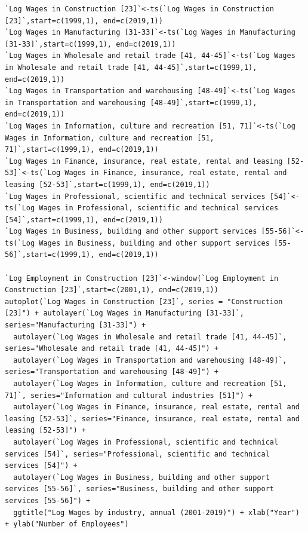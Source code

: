 \documentclass[12pt]{article}
\begin{document}
\begin{verbatim}
`Log Wages in Construction [23]`<-ts(`Log Wages in Construction [23]`,start=c(1999,1), end=c(2019,1))
`Log Wages in Manufacturing [31-33]`<-ts(`Log Wages in Manufacturing [31-33]`,start=c(1999,1), end=c(2019,1))
`Log Wages in Wholesale and retail trade [41, 44-45]`<-ts(`Log Wages in Wholesale and retail trade [41, 44-45]`,start=c(1999,1), end=c(2019,1))
`Log Wages in Transportation and warehousing [48-49]`<-ts(`Log Wages in Transportation and warehousing [48-49]`,start=c(1999,1), end=c(2019,1))
`Log Wages in Information, culture and recreation [51, 71]`<-ts(`Log Wages in Information, culture and recreation [51, 71]`,start=c(1999,1), end=c(2019,1))
`Log Wages in Finance, insurance, real estate, rental and leasing [52-53]`<-ts(`Log Wages in Finance, insurance, real estate, rental and leasing [52-53]`,start=c(1999,1), end=c(2019,1))
`Log Wages in Professional, scientific and technical services [54]`<-ts(`Log Wages in Professional, scientific and technical services [54]`,start=c(1999,1), end=c(2019,1))
`Log Wages in Business, building and other support services [55-56]`<-ts(`Log Wages in Business, building and other support services [55-56]`,start=c(1999,1), end=c(2019,1))

`Log Employment in Construction [23]`<-window(`Log Employment in Construction [23]`,start=c(2001,1), end=c(2019,1)) 
autoplot(`Log Wages in Construction [23]`, series = "Construction [23]") + autolayer(`Log Wages in Manufacturing [31-33]`, series="Manufacturing [31-33]") +
  autolayer(`Log Wages in Wholesale and retail trade [41, 44-45]`, series="Wholesale and retail trade [41, 44-45]") +
  autolayer(`Log Wages in Transportation and warehousing [48-49]`, series="Transportation and warehousing [48-49]") +
  autolayer(`Log Wages in Information, culture and recreation [51, 71]`, series="Information and cultural industries [51]") +
  autolayer(`Log Wages in Finance, insurance, real estate, rental and leasing [52-53]`, series="Finance, insurance, real estate, rental and leasing [52-53]") +
  autolayer(`Log Wages in Professional, scientific and technical services [54]`, series="Professional, scientific and technical services [54]") +
  autolayer(`Log Wages in Business, building and other support services [55-56]`, series="Business, building and other support services [55-56]") +
  ggtitle("Log Wages by industry, annual (2001-2019)") + xlab("Year") + ylab("Number of Employees")

\end{verbatim}

\newpage
\end{document}
